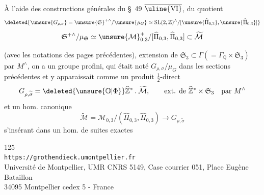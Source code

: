 À l'aide des constructions générales du \S~49 $\overline{\uline{\mathrm{VI}}}$,  du quotient
\[
\deleted{\unsure{G_{\rho,\sigma}}=\unsure{\mathfrak S}^{+\wedge}/\unsure{\mu_G}\simeq
\operatorname{SL}(2,\mathbb Z)^\wedge/
[\unsure{\widehat\Pi_{0,3}},\unsure{\widehat\Pi_{0,3}}]}
\]
\[
\mathfrak S^{+\wedge}/\mu_{\mathfrak S}\simeq
\unsure{\mathcal M}_{0,3}^{+}/[\widehat\Pi_{0,3},\widehat\Pi_{0,3}]
\subset\widetilde{\mathcal M}
\]


 (avec les notations des pages précédentes), extension de $\mathfrak S_3\subset\Gamma(=\Gamma_{\mathbb Q}\times\mathfrak S_3)$ par $M^\wedge$, on a  un groupe profini,  qui était noté $G_{\rho,\sigma}/\mu_G$  dans les sections précédentes et y apparaissait comme un produit $\frac12$-direct
\[
G_{\rho,\widetilde\sigma}
=\deleted{\unsure{\mathbb O|\Phi}}\widehat{\mathbb Z}^{*}\mathbin{.}\widetilde{\mathcal M},
\qquad\text{ext. de }\widehat{\mathbb Z}^{*}\times\mathfrak S_3
\quad\text{par }M^\wedge
\]
et un hom. canonique
\[
\widetilde{\mathcal M}
=\mathcal M_{0,3}/(\widehat\Pi_{0,3},\widehat\Pi_{0,3})
\longrightarrow G_{\rho,\widetilde\sigma}
\]
s'insérant dans un hom. de suites exactes


\begin{center}
\small
125\\
\texttt{https://grothendieck.umontpellier.fr}\\
Université de Montpellier, UMR CNRS 5149, Case courrier 051, Place Eugène Bataillon\\
34095 Montpellier cedex 5 - France
\end{center}


\diagram{
\[
\begin{tikzcd}[column sep=large,row sep=huge]
1 \arrow[r,no head] &
\widehat M \arrow[r] \arrow[d,Rightarrow] &
\widetilde{\mathcal M} \arrow[r] \arrow[d] &
\underbrace{\Gamma}_{N_{0,3}=\Gamma_{\mathbb Q}\times\mathfrak S_3}
\arrow[r,no head] \arrow[d,"\unsure{\chi}\times\operatorname{id}_{\mathfrak S_3}"] & 1 \\
1 \arrow[r,no head] &
\widehat M \arrow[r,no head] &
G_{\rho,\widetilde\sigma} \arrow[r] &
\widehat{\mathbb Z}^{*}\times\mathfrak S_3 \arrow[r,no head] & 1 .
\end{tikzcd}
\tag{282}
\]
}

